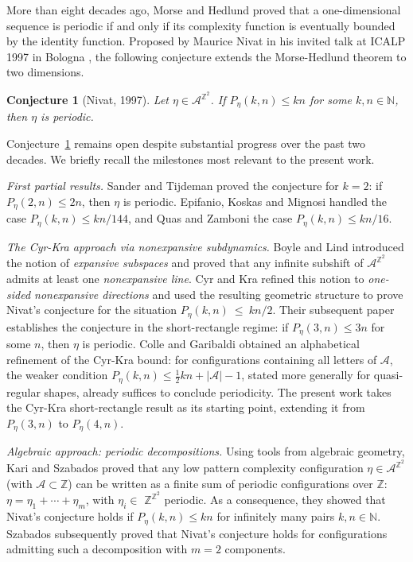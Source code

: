 \documentclass[12pt]{amsart}
\numberwithin{equation}{section}
\newtheorem{conjecture}[theorem]{Conjecture}
\newcommand{\bb}[1]{\mathbb{#1}}
\begin{document}
More than eight decades ago, Morse and Hedlund \cite{MorseHedlund38,MorseHedlund42} proved that a
one-dimensional sequence is periodic if and only if its complexity
function is eventually bounded by the identity function. Proposed
by Maurice Nivat in his invited talk at ICALP 1997 in Bologna
\cite{Nivat97}, the following conjecture extends the Morse-Hedlund
theorem to two dimensions.

\begin{conjecture}[Nivat, 1997]\label{conj:Nivat}
  Let $\eta\in\mathcal A^{\mathbb Z^2}$.  If $P_\eta(k,n)\le kn$ for some
  $k,n\in\mathbb N$, then $\eta$ is periodic.
\end{conjecture}

\noindent
Conjecture~\ref{conj:Nivat} remains open despite substantial progress
over the past two decades. We briefly recall the milestones most
relevant to the present work.

\medskip\noindent\textit{First partial results.}
Sander and Tijdeman \cite{SanderTijdeman02} proved the conjecture for
$k=2$: if $P_\eta(2,n)\le 2n$, then $\eta$ is periodic. Epifanio, Koskas and Mignosi \cite{EpifanioKosasMignosi03} handled the
case $P_\eta(k,n) \le kn/144$, and Quas and Zamboni \cite{QuasZamboni04} the case $P_\eta(k,n)\le kn/16$.

\medskip\noindent\textit{The Cyr-Kra approach via nonexpansive subdynamics.}
Boyle and Lind \cite{BoyleLind97} introduced the notion of
\emph{expansive subspaces} and proved that any infinite subshift of
$\mathcal A^{\mathbb Z^2}$ admits at least one \emph{nonexpansive line}.
Cyr and Kra \cite{CyrKra15} refined this notion to
\emph{one-sided nonexpansive directions} and used the resulting
geometric structure to prove Nivat's conjecture for the situation
$P_\eta(k,n)~\le~kn/2$.
Their subsequent paper \cite{CyrKra16} establishes the conjecture in
the short-rectangle regime: if $P_\eta(3,n)\le 3n$ for some $n$,
then $\eta$ is periodic. Colle and Garibaldi \cite{ColleGaribaldi20} obtained an alphabetical refinement of the Cyr-Kra bound: for configurations containing all letters of $\mathcal A$, the weaker condition $P_\eta(k,n) \le \frac{1}{2}kn + |\mathcal A| - 1 $, stated more generally for quasi-regular shapes, already suffices to conclude periodicity. The present work takes the Cyr-Kra short-rectangle result as its starting point, extending it from $P_\eta(3,n)$ to $P_\eta(4,n)$.

\medskip\noindent\textit{Algebraic approach: periodic decompositions.}
Using tools from algebraic geometry, Kari and Szabados
\cite{KariSzabados20} proved that any low pattern complexity
configuration $\eta\in\mathcal A^{\mathbb Z^2}$ (with $\mathcal A\subset\mathbb Z$) can be written
as a finite sum of periodic configurations over $\mathbb Z$:
$\eta=\eta_1+\cdots+\eta_m$, with $\eta_i \in$ $\bb{Z}^{\bb{Z}^2}$ periodic. 
As a consequence, they showed that Nivat's conjecture holds if $P_{\eta}(k,n) \leq kn$ for infinitely many pairs $k,n \in \bb{N}$. Szabados \cite{Szabados18} subsequently proved that Nivat's conjecture
holds for configurations admitting such a decomposition with
$m=2$ components. 
\end{document}
